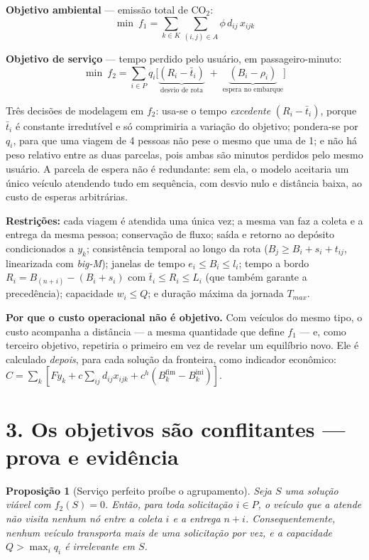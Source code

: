 \documentclass[10pt,a4paper]{article}
\theoremstyle{plain}
\newtheorem{proposicao}{Proposição}
\begin{document}
\textbf{Objetivo ambiental} --- emissão total de $\text{CO}_2$:
\begin{equation}
\min\ f_1 = \sum_{k \in K} \sum_{(i,j) \in A} \phi\, d_{ij}\, x_{ijk}
\tag{$f_1$}
\end{equation}

\textbf{Objetivo de serviço} --- tempo perdido pelo usuário, em passageiro-minuto:
\begin{equation}
\min\ f_2 = \sum_{i \in P} q_i \Big[ \underbrace{(R_i - \bar{t}_i)}_{\text{desvio de rota}} \;+\; \underbrace{(B_i - \rho_i)}_{\text{espera no embarque}} \Big]
\tag{$f_2$}
\end{equation}

Três decisões de modelagem em $f_2$: usa-se o tempo \textit{excedente} $(R_i-\bar t_i)$, porque $\bar t_i$ é constante irredutível e só comprimiria a variação do objetivo; pondera-se por $q_i$, para que uma viagem de 4 pessoas não pese o mesmo que uma de 1; e não há peso relativo entre as duas parcelas, pois ambas são minutos perdidos pelo mesmo usuário. A parcela de espera não é redundante: sem ela, o modelo aceitaria um único veículo atendendo tudo em sequência, com desvio nulo e distância baixa, ao custo de esperas arbitrárias.

\textbf{Restrições:} cada viagem é atendida uma única vez; a mesma van faz a coleta e a entrega da mesma pessoa; conservação de fluxo; saída e retorno ao depósito condicionados a $y_k$; consistência temporal ao longo da rota ($B_j \ge B_i + s_i + t_{ij}$, linearizada com \textit{big-M}); janelas de tempo $e_i \le B_i \le l_i$; tempo a bordo $R_i = B_{(n+i)} - (B_i + s_i)$ com $\bar t_i \le R_i \le L_i$ (que também garante a precedência); capacidade $w_i \le Q$; e duração máxima da jornada $T_{max}$.

\textbf{Por que o custo operacional não é objetivo.} Com veículos do mesmo tipo, o custo acompanha a distância --- a mesma quantidade que define $f_1$ --- e, como terceiro objetivo, repetiria o primeiro em vez de revelar um equilíbrio novo. Ele é calculado \textit{depois}, para cada solução da fronteira, como indicador econômico: $C = \sum_k [F y_k + c\sum_{ij} d_{ij}x_{ijk} + c^h(B^{\text{fim}}_k - B^{\text{ini}}_k)]$.

\section*{3. Os objetivos são conflitantes --- prova e evidência}

\begin{proposicao}[Serviço perfeito proíbe o agrupamento]
Seja $S$ uma solução viável com $f_2(S)=0$. Então, para toda solicitação $i \in P$, o veículo que a atende não visita nenhum nó entre a coleta $i$ e a entrega $n+i$. Consequentemente, nenhum veículo transporta mais de uma solicitação por vez, e a capacidade $Q > \max_i q_i$ é irrelevante em $S$.
\end{proposicao}
\end{document}
